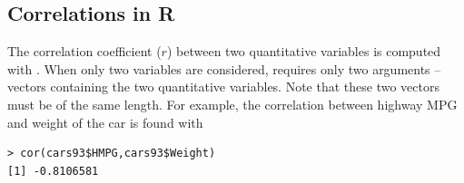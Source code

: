 \documentclass[10pt,openany]{book}\usepackage[]{graphicx}\usepackage[]{color}
\makeatletter
\newenvironment{kframe}{%
 \def\at@end@of@kframe{}%
 \ifinner\ifhmode%
  \def\at@end@of@kframe{\end{minipage}}%
  \begin{minipage}{\columnwidth}%
 \fi\fi%
 \def\FrameCommand##1{\hskip\@totalleftmargin \hskip-\fboxsep
 \colorbox{shadecolor}{##1}\hskip-\fboxsep
     \hskip-\linewidth \hskip-\@totalleftmargin \hskip\columnwidth}%
 \MakeFramed {\advance\hsize-\width
   \@totalleftmargin\z@ \linewidth\hsize
   \@setminipage}}%
 {\par\unskip\endMakeFramed%
 \at@end@of@kframe}
\newenvironment{knitrout}{}{} %
\makeatother
\begin{document}
\subsection{Correlations in R}
 \label{sect:Correlation}
The correlation coefficient ($r$) between two quantitative variables is computed with .  When only two variables are considered,  requires only two arguments -- vectors containing the two quantitative variables.  Note that these two vectors must be of the same length.  For example, the correlation between highway MPG and weight of the car is found with
\begin{knitrout}
\color{fgcolor}\begin{kframe}
\begin{verbatim}
> cor(cars93$HMPG,cars93$Weight)
[1] -0.8106581
\end{verbatim}
\end{kframe}
\end{knitrout}
\end{document}
